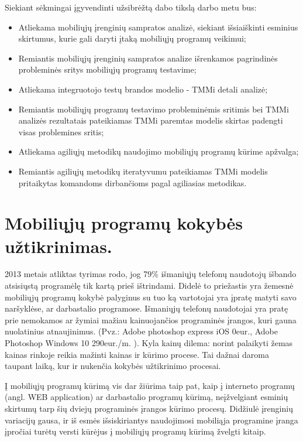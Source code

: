 \documentclass{VUMIFPSkursinis}
\begin{document}
Siekiant sėkmingai įgyvendinti užsibrėžtą dabo tikslą darbo metu bus:
\begin{itemize}
   \item Atliekama mobiliųjų įrenginių sampratos analizė, siekiant išsiaiškinti esminius skirtumus, kurie gali daryti įtaką mobiliųjų programų veikimui;
   \item Remiantis mobiliųjų įrenginių sampratos analize išrenkamos pagrindinės probleminės sritys mobiliųjų programų testavime;
   \item Atliekama integruotojo testų brandos modelio - TMMi detali analizė;
   \item Remiantis mobiliųjų programų testavimo probleminėmis sritimis bei TMMi analizės rezultatais pateikiamas TMMi paremtas modelis skirtas padengti visas problemines sritis;
   \item Atliekama agiliųjų metodikų naudojimo mobiliųjų programų kūrime apžvalga;
   \item Remiantis agiliųjų metodikų iteratyvumu pateikiamas TMMi modelis pritaikytas komandoms dirbančioms pagal agiliasias metodikas.
\end{itemize}



\section{Mobiliųjų programų kokybės užtikrinimas.}

2013 metais atliktas tyrimas \cite {compuware.com} rodo, jog 79\% išmaniųjų telefonų naudotojų išbando atsisiųstą programėlę tik kartą prieš ištrindami. Didelė to priežastis yra žemesnė mobiliųjų programų kokybė palyginus su tuo ką vartotojai yra įpratę matyti savo naršyklėse, ar darbastalio programose. Išmaniųjų telefonų naudotojai yra pratę prie nemokamos ar žymiai mažiau kainuojančios programinės įrangos, kuri gauna nuolatinius atnaujinimus. (Pvz.: Adobe photoshop express iOS 0eur., Adobe Photoshop Windows 10 290eur./m. \cite{adobe.com}). Kyla kainų dilema: norint palaikyti žemas kainas rinkoje reikia mažinti kainas ir kūrimo procese. Tai dažnai daroma taupant laiką, kur ir nukenčia kokybės užtikrinimo procesai.

Į mobiliųjų programų kūrimą vis dar žiūrima taip pat, kaip į interneto programų (angl. WEB application) ar darbastalio programų kūrimą, neįžvelgiant esminių skirtumų tarp šių dviejų programinės įrangos kūrimo procesų. Didžiulė įrenginių variacijų gausa, ir iš esmės išsiskiriantys naudojimosi mobiliąja programine įranga įpročiai turėtų versti kūrėjus į mobiliųjų programų kūrimą žvelgti kitaip.
\end{document}

